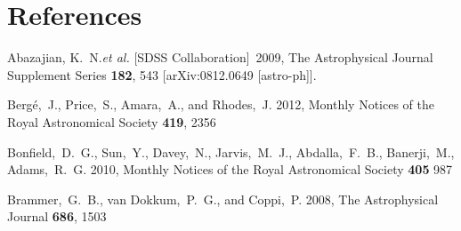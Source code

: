 \documentclass[prd,nofootbib,floatfix,11pt,tightenlines]{revtex4}
\begin{document}
\newpage


\section*{References}
\begin{thebibliography}{99}
  Abazajian, K.~N.{\it et al.}  [SDSS Collaboration]~2009,
  The Astrophysical Journal Supplement Series  {\bf 182}, 543
  [arXiv:0812.0649 [astro-ph]].





Berg\'e,~J., Price,~S., Amara,~A., and Rhodes,~J. 2012,
Monthly Notices of the Royal Astronomical Society {\bf 419}, 2356



Bonfield,~D.~G., Sun,~Y., Davey,~N., Jarvis,~M.~J., Abdalla,~F.~B.,
Banerji,~M., Adams,~R.~G. 2010, Monthly Notices of the Royal Astronomical Society 
{\bf 405} 987

Brammer,~G.~B., van Dokkum,~P.~G., and Coppi,~P. 2008,
The Astrophysical Journal {\bf 686}, 1503


\end{thebibliography}
\end{document}
